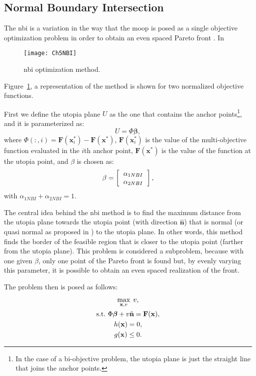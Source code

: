\subsection{Normal Boundary Intersection}
\label{sec:NBI}
%
The \gls{nbi} is a variation in the way that the \gls{moop} is posed as a single objective optimization problem in order to obtain an even spaced Pareto front \citep{Das1998}. In %
%
\begin{figure}[b]%
	\centering
	\texttt{[image: Ch5NBI]}%
	\caption{\gls{nbi} optimization method.}%
	\label{fig:NBI}%
\end{figure}
%
Figure~\ref{fig:NBI}, a representation of the method is shown for two normalized objective functions.

First we define the utopia plane $U$ as the one that contains the anchor points\footnote{In the case of a bi-objective problem, the utopia plane is just the straight line that joins the anchor points.}, and it  is parameterized as:
%
\begin{equation}
	U = \Phi\mathbf{\beta},
	\label{eq:UtpiaPlaneNBI}
\end{equation}
%
where $\Phi(:,i)=\mathbf{F}(\mathbf{x}_i^*)-\mathbf{F}(\mathbf{x}^*)$, $\mathbf{F}(\mathbf{x}_i^*)$ is the value of the multi-objective function evaluated in the $i$th anchor point, $\mathbf{F}(\mathbf{x}^*)$ is the value of the function at the utopia point, and $\beta$ is chosen as:
\begin{equation}
\beta=
\left[\begin{tabular}{c}
$\alpha_{1NBI}$ \\ $\alpha_{2NBI}$
\end{tabular}\right],
\label{eq:Beta}
\end{equation}
with $\alpha_{1NBI}+\alpha_{2NBI}=1$.

The central idea behind the \gls{nbi} method is to find the maximum distance from the utopia plane towards the utopia point (with direction $\hat{\mathbf{n}}$) that is normal (or quasi normal as proposed in \citet{Das1998}) to the utopia plane. In other words, this method finds the border of the feasible region that is closer to the utopia point (farther from the utopia plane). This problem is considered a subproblem, because with one given $\beta$, only one point of the Pareto front is found but, by evenly varying this parameter, it is possible to obtain an even spaced realization of the front.

The problem then is posed as follows:%
%
\begin{equation}
\begin{gathered}
\max_{\mathbf{x},v}{\;v}, \\
\text{s.t.} \ \Phi \boldsymbol{\beta} + v \hat{\mathbf{n}} = \mathbf{F}(\mathbf{x}),\\
h(\mathbf{x})=0, \\
g(\mathbf{x}) \leq 0.
\end{gathered}
\label{eq:NBIProblem}
\end{equation}%

